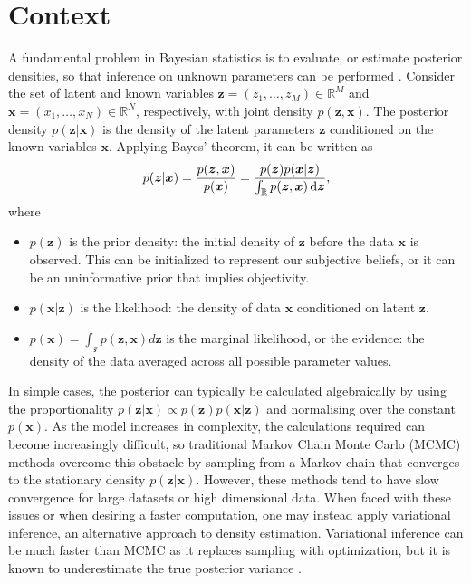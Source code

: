 \documentclass[honours,12pt, twoside]{unswthesis}
\newcommand{\R}{\mathbb{R}}
\numberwithin{equation}{section}
\theoremstyle{definition}
\begin{document}
\section{Context}\label{sec:3.1}
A fundamental problem in Bayesian statistics is to evaluate, or estimate posterior densities, so that inference on unknown parameters can be performed \citep{gelman}. Consider the set of latent and known variables $\bm{z}=(z_1,\dots,z_M)\in \R^M$ and $\bm{x}=(x_1,\dots,x_N)\in \R^N$, respectively, with joint density $p(\bm{z},\bm{x})$. The posterior density $p(\bm{z}|\bm{x})$ is the density of the latent parameters $\bm{z}$ conditioned on the known variables $\bm{x}$. Applying Bayes' theorem, it can be written as
\begin{equation*}
p(\bm{z}|\bm{x})=\frac{p(\bm{z},\bm{x})}{p(\bm{x})}= \frac{p(\bm{z})p(\bm{x}|\bm{z})}{\int_\R p(\bm{z},\bm{x})\, {\rm d}\bm{z}},
\end{equation*}
where
\begin{itemize}
\item $p(\bm{z})$ is the prior density: the initial density of $\bm{z}$ before the data $\bm{x}$ is observed. This can be initialized to represent our subjective beliefs, or it can be an uninformative prior that implies objectivity.
\item $p(\bm{x}|\bm{z})$ is the likelihood: the density of data $\bm{x}$ conditioned on latent $\bm{z}$.
\item $p(\bm{x})=\int_\mathcal{z}p(\bm{z},\bm{x})d\bm{z}$ is the marginal likelihood, or the evidence: the density of the data averaged across all possible parameter values.
\end{itemize}
In simple cases, the posterior can typically be calculated algebraically by using the proportionality $p(\bm{z}|\bm{x})\propto p(\bm{z})p(\bm{x|z})$ and normalising over the constant $p(\bm{x})$. As the model increases in complexity, the calculations required can become increasingly difficult, so
traditional Markov Chain Monte Carlo (MCMC) methods overcome this obstacle by sampling from a Markov chain that converges to the stationary density $p(\bm{z}|\bm{x})$. However, these methods tend to have slow convergence for large datasets or high dimensional data. When faced with these issues or when desiring a faster computation, one may instead apply variational inference, an alternative approach to density estimation. Variational inference can be much faster than MCMC as it replaces sampling with optimization, but it is known to underestimate the true posterior variance \citep{blei}.
\end{document}
